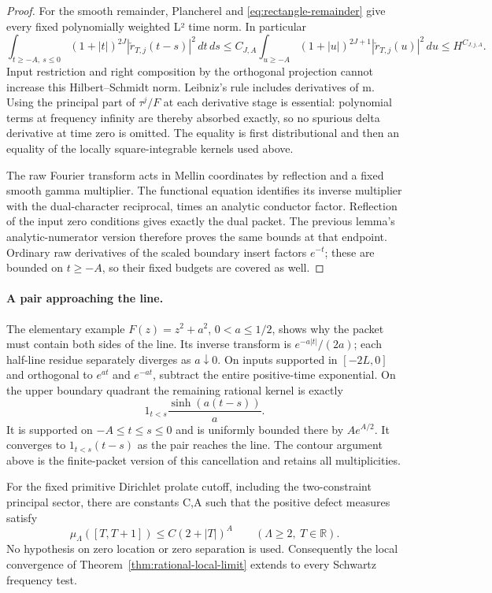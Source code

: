\begin{proof}
For the smooth remainder, Plancherel and
\eqref{eq:rectangle-remainder} give every fixed polynomially
weighted L² time norm.  In particular
\[
 \int_{t\geq-A,\ s\leq0}(1+|t|)^{2J}
       |\check r_{T,j}(t-s)|^2\,dt\,ds
 \leq C_{J,A}\int_{u\geq-A}(1+|u|)^{2J+1}
                         |\check r_{T,j}(u)|^2\,du
 \leq H^{C_{J,j,A}}.
\]
Input restriction and right composition by the orthogonal
projection cannot increase this Hilbert--Schmidt norm.
Leibniz's rule includes derivatives of m.
Using the principal part of $\tau^j/F$ at each derivative stage
is essential: polynomial terms at frequency infinity are thereby
absorbed exactly, so no spurious delta derivative at time zero
is omitted.  The equality is first distributional and then an
equality of the locally square-integrable kernels used above.

The raw Fourier transform acts in Mellin coordinates by reflection
and a fixed smooth gamma multiplier.  The functional equation
identifies its inverse multiplier with the dual-character
reciprocal, times an analytic conductor factor.  Reflection of
the input zero conditions gives exactly the dual packet.
The previous lemma's analytic-numerator version therefore proves
the same bounds at that endpoint.  Ordinary raw derivatives of
the scaled boundary insert factors $e^{-t}$; these are bounded
on $t\geq-A$, so their fixed budgets are covered as well.
\end{proof}

\paragraph{A pair approaching the line.}
The elementary example $F(z)=z^2+a^2$, $0<a\leq1/2$, shows why
the packet must contain both sides of the line.  Its inverse
transform is $e^{-a|t|}/(2a)$; each half-line residue separately
diverges as $a\downarrow0$.  On inputs supported in $[-2L,0]$
and orthogonal to $e^{at}$ and $e^{-at}$, subtract the entire
positive-time exponential.  On the upper boundary quadrant the
remaining rational kernel is exactly
\[
          1_{t<s}\frac{\sinh(a(t-s))}{a}.
\]
It is supported on $-A\leq t\leq s\leq0$ and is uniformly
bounded there by $A e^{A/2}$.  It converges to
$1_{t<s}(t-s)$ as the pair reaches the line.  The contour argument
above is the finite-packet version of this cancellation and
retains all multiplicities.

\begin{theorem}\label{thm:unconditional-frequency-tightness}
For the fixed primitive Dirichlet prolate cutoff, including the
two-constraint principal sector, there are constants C,A such that
the positive defect measures satisfy
\[
            \mu_\Lambda([T,T+1])\leq C(2+|T|)^A
            \qquad(\Lambda\geq2,\ T\in\mathbb R).
\]
No hypothesis on zero location or zero separation is used.
Consequently the local convergence of
Theorem~\ref{thm:rational-local-limit} extends to every Schwartz
frequency test.
\end{theorem}

